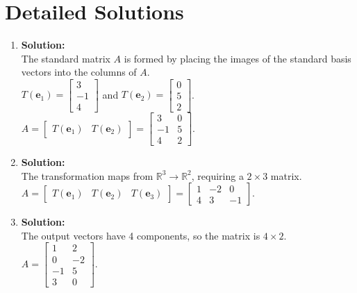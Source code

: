 \documentclass[12pt]{article}
\begin{document}
\clearpage

\section{Detailed Solutions}

\begin{enumerate}
    \item \textbf{Solution:}\\
    The standard matrix $A$ is formed by placing the images of the standard basis vectors into the columns of $A$. \\
    $T(\mathbf{e}_1) = \begin{bmatrix} 3 \\ -1 \\ 4 \end{bmatrix}$ and $T(\mathbf{e}_2) = \begin{bmatrix} 0 \\ 5 \\ 2 \end{bmatrix}$. \\
    $A = \begin{bmatrix} T(\mathbf{e}_1) & T(\mathbf{e}_2) \end{bmatrix} = \begin{bmatrix} 3 & 0 \\ -1 & 5 \\ 4 & 2 \end{bmatrix}$.

    \item \textbf{Solution:}\\
    The transformation maps from $\mathbb{R}^3 \rightarrow \mathbb{R}^2$, requiring a $2 \times 3$ matrix. \\
    $A = \begin{bmatrix} T(\mathbf{e}_1) & T(\mathbf{e}_2) & T(\mathbf{e}_3) \end{bmatrix} = \begin{bmatrix} 1 & -2 & 0 \\ 4 & 3 & -1 \end{bmatrix}$.

    \item \textbf{Solution:}\\
    The output vectors have 4 components, so the matrix is $4 \times 2$. \\
    $A = \begin{bmatrix} 1 & 2 \\ 0 & -2 \\ -1 & 5 \\ 3 & 0 \end{bmatrix}$.


\end{enumerate}
\end{document}

